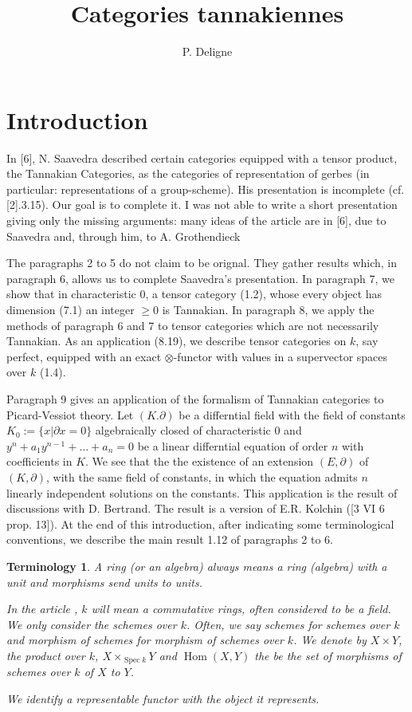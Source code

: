 \documentclass{article}
\title{Categories tannakiennes}
\author{P. Deligne}
\newtheorem{term}{Terminology}[section]
\DeclareMathOperator{\spec}{\text{Spec}}
\DeclareMathOperator{\Hom}{\text{Hom}}
\begin{document}
\maketitle

\section{Introduction}

In [6], N. Saavedra described certain categories equipped with a tensor product, the Tannakian Categories, as the
categories of representation of gerbes (in particular: representations of a group-scheme). His presentation is
incomplete (cf. [2].3.15). Our goal is to complete it. I was not able to write a short presentation giving only the 
missing arguments: many ideas of the article are in [6], due to Saavedra and, through him, to A. Grothendieck

The paragraphs 2 to 5 do not claim to be orignal. They gather results which, in paragraph 6, allows us to complete
Saavedra's presentation. In paragraph 7, we show that in characteristic 0, a tensor category (1.2), whose every
object has dimension (7.1) an integer $\geq 0$ is Tannakian. In paragraph 8, we apply the methods of paragraph 6 and
7 to tensor categories which are not necessarily Tannakian. As an application (8.19), we describe tensor categories
on $k$, say perfect, equipped with an exact $\otimes$-functor with values in a supervector spaces over $k$ (1.4).

Paragraph 9 gives an application of the formalism of Tannakian categories to Picard-Vessiot theory. Let $(K. \partial)$
be a differntial field with the field of constants $K_0 := \{x|\partial x = 0\}$ algebraically closed of characteristic
0 and $y^n + a_1 y^{n-1} + \dots + a_n = 0$ be a linear differntial equation of order $n$ with coefficients in $K$. 
We see that the the existence of an extension $(E,\partial)$ of $(K,\partial)$, with the same field of constants, in 
which the equation admits $n$ linearly independent solutions on the constants. This application is the result of 
discussions with D. Bertrand. The result is a version of E.R. Kolchin ([3 VI 6 prop. 13]). At the end of this 
introduction, after indicating some terminological conventions, we describe the main result 1.12 of paragraphs 2 to 6.

\begin{term}
A ring (or an algebra) always means a ring (algebra) with a unit and morphisms send units to units.

In the article , $k$ will mean a commutative rings, often considered to be a field. We only consider the schemes over 
$k$. Often, we say schemes for schemes over $k$ and morphism of schemes for morphism of schemes over $k$. We denote
by $X \times Y$, the product over $k$, $X \times _ {\spec k} Y$ and $\Hom (X,Y)$ the be the set of morphisms of 
schemes over $k$ of $X$ to $Y$.

We identify a representable functor with the object it represents.
\end{term}
\end{document}
